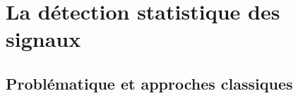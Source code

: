 \documentclass[a4paper, 10pt]{article}
\begin{document}


\section{La détection statistique des signaux}

\subsection{Problématique et approches classiques}

\end{document}
